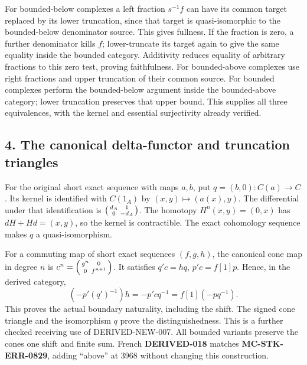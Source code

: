 For bounded-below complexes a left fraction \(s^{-1}f\) can have its common target replaced by its lower truncation,\allowbreak{} since that target is quasi-isomorphic to the bounded-below denominator source. This gives fullness. If the fraction is zero,\allowbreak{} a further denominator kills \(f\); lower-truncate its target again to give the same equality inside the bounded category. Additivity reduces equality of arbitrary fractions to this zero test,\allowbreak{} proving faithfulness. For bounded-above complexes use right fractions and upper truncation of their common source. For bounded complexes perform the bounded-below argument inside the bounded-above category; lower truncation preserves that upper bound. This supplies all three equivalences,\allowbreak{} with the kernel and essential surjectivity already verified.

\subsection{4. The canonical delta-functor and truncation triangles}\label{proofs-3487-4161-the-canonical-delta-functor-and-truncation-triangles}

For the original short exact sequence with maps \(a,b\),\allowbreak{} put \(q=(b,0):C(a)\to C\). Its kernel is identified with \(C(1_A)\) by \((x,y)\mapsto(a(x),y)\). The differential under that identification is \(\begin{psmallmatrix}d_A&1\\0&-d_A\end{psmallmatrix}\). The homotopy \(H^n(x,y)=(0,x)\) has \(dH+Hd=(x,y)\),\allowbreak{} so the kernel is contractible. The exact cohomology sequence makes \(q\) a quasi-isomorphism.

For a commuting map of short exact sequences \((f,g,h)\),\allowbreak{} the canonical cone map in degree \(n\) is \(c^n=\begin{psmallmatrix}g^n&0\\0&f^{n+1}\end{psmallmatrix}\). It satisfies \(q'c=hq\),\allowbreak{} \(p'c=f[1]p\). Hence,\allowbreak{} in the derived category,\allowbreak{} \[
(-p'(q')^{-1})h=-p'c q^{-1}=f[1](-pq^{-1}).
\] This proves the actual boundary naturality,\allowbreak{} including the shift. The signed cone triangle and the isomorphism \(q\) prove the distinguishedness. This is a further checked receiving use of DERIVED-NEW-007. All bounded variants preserve the cone\textquotesingle s one shift and finite sum. French \textbf{DERIVED-018} matches \textbf{MC-STK-ERR-0829},\allowbreak{} adding ``above'' at 3968 without changing this construction.

